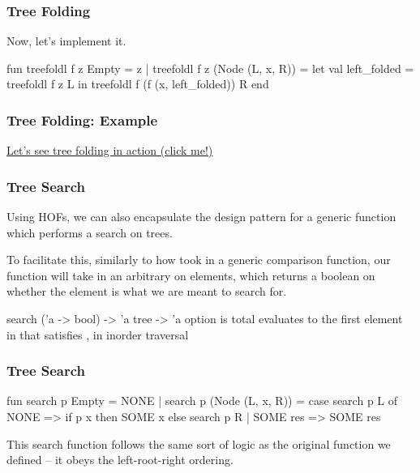 \documentclass[aspectratio=169, handout]{beamer}
\begin{document}
\begin{frame}[fragile]
  \frametitle{Tree Folding}

  Now, let's implement it.

  \pause
  \vspace{\fill}

  \begin{codeblock}
    fun treefoldl f z Empty = z
      | treefoldl f z (Node (L, x, R)) =
          let
            val left_folded = treefoldl f z L
          in
            treefoldl f (f (x, left_folded)) R
          end
  \end{codeblock}
\end{frame}

\begin{frame}[fragile]
  \frametitle{Tree Folding: Example}

  {\color{blue}\href{https://asciinema.org/a/vb4tp7vH1aFMNHKabkex1TsJH}{Let's see tree folding in action (click me!)}}

\end{frame}

\begin{frame}[fragile]
  \frametitle{Tree Search}

  Using HOFs, we can also encapsulate the design pattern for a generic function which
  performs a search on trees.

  \pause
  \vspace{\fill}

  To facilitate this, similarly to how  took in a generic comparison function,
  our  function will take in an arbitrary  on elements, which
  returns a boolean on whether the element is what we are meant to search for.

  \pause
  \vspace{\fill}

  \spec
    {search}
    {('a -> bool) -> 'a tree -> 'a option}
    { is total}
    { evaluates to the first element in  that satisfies , in
    inorder traversal}
\end{frame}

\begin{frame}[fragile]
  \frametitle{Tree Search}

  \rprs

  \begin{codeblock}
    fun search p Empty = NONE
      | search p (Node (L, x, R)) =
        case search p L of
          NONE =>
            if p x then SOME x
            else search p R
        | SOME res => SOME res
  \end{codeblock}

  \vspace{\fill}

  This search function follows the same sort of logic as the original
   function we defined -- it obeys the left-root-right ordering.
\end{frame}
\end{document}

